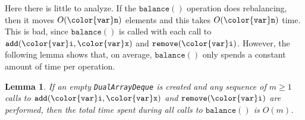 \documentclass[10pt]{book}
\theoremstyle{plain}
\newtheorem{lem}{Lemma}[chapter]
\newcommand{\lemlabel}[1]{\label{lem:#1}}
\theoremstyle{definition}
\begin{document}
Here there is little to analyze.  If the \ensuremath{\mathtt{balance()}} operation does
rebalancing, then it moves $O(\ensuremath{\mathtt{{\color{var}n}}})$ elements and this takes $O(\ensuremath{\mathtt{{\color{var}n}}})$
time. This is bad, since \ensuremath{\mathtt{balance()}} is called with each call to
\ensuremath{\mathtt{add({\color{var}i},{\color{var}x})}} and \ensuremath{\mathtt{remove({\color{var}i})}}.  However, the following lemma shows that, on
average, \ensuremath{\mathtt{balance()}} only spends a constant amount of time per operation.

\begin{lem}\lemlabel{dualarraydeque-amortized}
  If an empty \texttt{DualArrayDeque} is created and any sequence of $m\ge 1$ calls
  to \ensuremath{\mathtt{add({\color{var}i},{\color{var}x})}} and \ensuremath{\mathtt{remove({\color{var}i})}} are performed, then the total time spent
  during all calls to \ensuremath{\mathtt{balance()}} is $O(m)$.
\end{lem}
\end{document}
